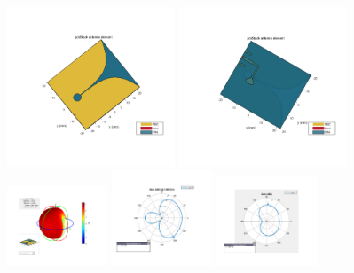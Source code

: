 \documentclass{ctexbeamer}
\begin{document}
\begin{frame}
    \begin{figure}
        \includegraphics[width=5cm]{1-3.pdf}
        \includegraphics[width=5cm]{1-4.pdf}\\
        \includegraphics[width=3cm]{1-5.pdf}
        \includegraphics[width=3cm]{1-6.pdf}
        \includegraphics[width=3cm]{1-7.pdf}
    \end{figure}
\end{frame}
\end{document}
